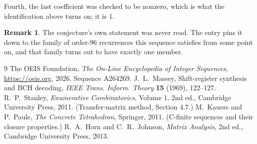 \documentclass[11pt,a4paper]{article}
\theoremstyle{plain}
\theoremstyle{definition}
\newtheorem{remark}[theorem]{Remark}
\begin{document}
Fourth, the last coefficient was checked to be nonzero, which is what the identification above
turns on; it is $1$.

\begin{remark}
The conjecture's own statement was never read. The entry pins it down to the family of
order-$96$ recurrences this sequence satisfies from some point on, and that family turns
out to have exactly one member.
\end{remark}

\begin{thebibliography}{9}
 The OEIS Foundation, \emph{The On-Line Encyclopedia of Integer
Sequences}, \url{https://oeis.org}, 2026. Sequence A264269.
 J.~L.~Massey, Shift-register synthesis and BCH decoding, \emph{IEEE
Trans. Inform. Theory} \textbf{15} (1969), 122--127.
 R.~P.~Stanley, \emph{Enumerative Combinatorics}, Volume 1, 2nd ed.,
Cambridge University Press, 2011. (Transfer-matrix method, Section 4.7.)
 M.~Kauers and P.~Paule, \emph{The Concrete Tetrahedron}, Springer, 2011.
(C-finite sequences and their closure properties.)
 R.~A.~Horn and C.~R.~Johnson, \emph{Matrix Analysis}, 2nd ed., Cambridge
University Press, 2013.
\end{thebibliography}
\end{document}
